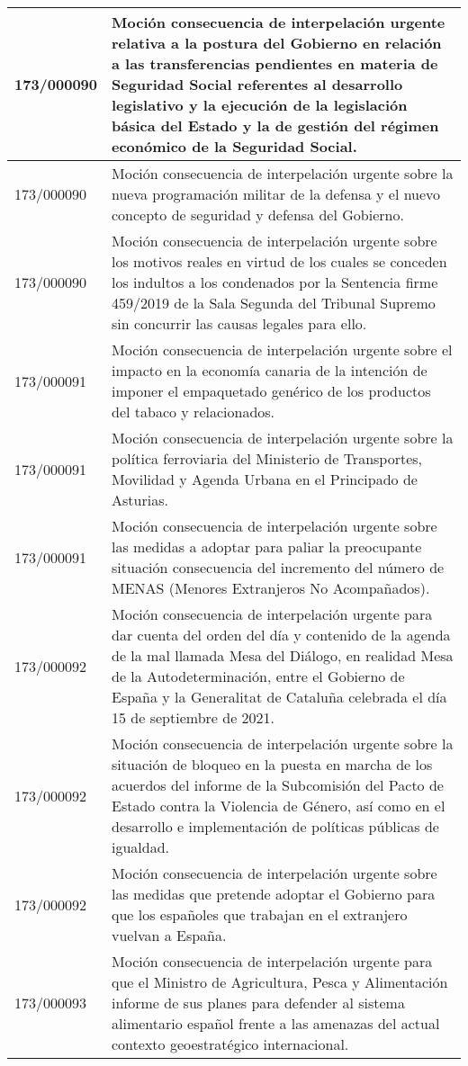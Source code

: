 {\begin{table}[H]
\begin{center}
\begin{tabularx}{\linewidth}{| l | X |}
\hline
173/000090 & Moción consecuencia de interpelación urgente relativa a la postura del Gobierno en relación a las transferencias pendientes en materia de Seguridad Social referentes al desarrollo legislativo y la ejecución de la legislación básica del Estado y la de gestión del régimen económico de la Seguridad Social. \\
\hline
173/000090 & Moción consecuencia de interpelación urgente sobre la nueva programación militar de la defensa y el nuevo concepto de seguridad y defensa del Gobierno. \\
\hline
173/000090 & Moción consecuencia de interpelación urgente sobre los motivos reales en virtud de los cuales se conceden los indultos a los condenados por la Sentencia firme 459/2019 de la Sala Segunda del Tribunal Supremo sin concurrir las causas legales para ello. \\
\hline
173/000091 & Moción consecuencia de interpelación urgente sobre el impacto en la economía canaria de la intención de imponer el empaquetado genérico de los productos del tabaco y relacionados. \\
\hline
173/000091 & Moción consecuencia de interpelación urgente sobre la política ferroviaria del Ministerio de Transportes, Movilidad y Agenda Urbana en el Principado de Asturias. \\
\hline
173/000091 & Moción consecuencia de interpelación urgente sobre las medidas a adoptar para paliar la preocupante situación consecuencia del incremento del número de MENAS (Menores Extranjeros No Acompañados). \\
\hline
173/000092 & Moción consecuencia de interpelación urgente para dar cuenta del orden del día y contenido de la agenda de la mal llamada Mesa del Diálogo, en realidad Mesa de la Autodeterminación, entre el Gobierno de España y la Generalitat de Cataluña celebrada el día 15 de septiembre de 2021. \\
\hline
173/000092 & Moción consecuencia de interpelación urgente sobre la situación de bloqueo en la puesta en marcha de los acuerdos del informe de la Subcomisión del Pacto de Estado contra la Violencia de Género, así como en el desarrollo e implementación de políticas públicas de igualdad. \\
\hline
173/000092 & Moción consecuencia de interpelación urgente sobre las medidas que pretende adoptar el Gobierno para que los españoles que trabajan en el extranjero vuelvan a España. \\
\hline
173/000093 & Moción consecuencia de interpelación urgente para que el Ministro de Agricultura, Pesca y Alimentación informe de sus planes para defender al sistema alimentario español frente a las amenazas del actual contexto geoestratégico internacional. \\

\end{tabularx}
\end{center}
\end{table}}
